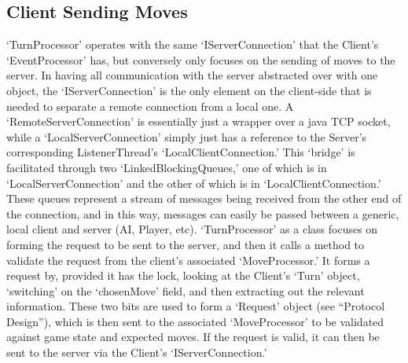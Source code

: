 \documentclass[a4paper,doc,draftfirst]{apa6}
\begin{document}
\subsection{Client Sending Moves}
‘TurnProcessor’ operates with the same ‘IServerConnection’ that the Client’s ‘EventProcessor’ has, but conversely only focuses on the sending of moves to the server. In having all communication with the server abstracted over with one object, the ‘IServerConnection’ is the only element on the client-side that is needed to separate a remote connection from a local one. A ‘RemoteServerConnection’ is essentially just a wrapper over a java TCP socket, while a ‘LocalServerConnection’ simply just has a reference to the Server’s corresponding ListenerThread’s ‘LocalClientConnection.’ This ‘bridge’ is facilitated through two ‘LinkedBlockingQueues,’ one of which is in ‘LocalServerConnection’ and the other of which is in ‘LocalClientConnection.’ These queues represent a stream of messages being received from the other end of the connection, and in this way, messages can easily be passed between a generic, local client and server (AI, Player, etc). ‘TurnProcessor’ as a class focuses on forming the request to be sent to the server, and then it calls a method to validate the request from the client’s associated ‘MoveProcessor.’ It forms a request by, provided it has the lock, looking at the Client’s ‘Turn’ object, ‘switching’ on the ‘chosenMove’ field, and then extracting out the relevant information. These two bits are used to form a ‘Request’ object (see  “Protocol Design”), which is then sent to the associated ‘MoveProcessor’ to be validated against game state and expected moves. If the request is valid, it can then be sent to the server via the Client’s ‘IServerConnection.’
\end{document}

